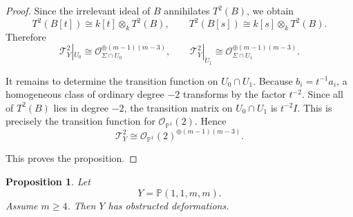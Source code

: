 \documentclass[11pt,twoside]{amsart}
\theoremstyle{plain}
\numberwithin{equation}{section}
\newtheorem{proposition}[theorem]{Proposition}
\newcommand{\OO}{\mathcal{O}}
\newcommand{\PP}{\mathbb{P}}
\theoremstyle{definition}
\begin{document}
\begin{proof}
Since the irrelevant ideal of \(B\) annihilates \(T^2(B)\), we obtain
\[
T^2(B[t])
\cong
k[t]\otimes_k T^2(B),
\qquad
T^2(B[s])
\cong
k[s]\otimes_k T^2(B).
\]
Therefore
\[
\mathcal{T}^2_Y|_{U_0}\cong \OO_{\Sigma\cap U_0}^{\oplus (m-1)(m-3)},
\qquad
\mathcal{T}^2_Y|_{U_1}\cong \OO_{\Sigma\cap U_1}^{\oplus (m-1)(m-3)}.
\]

It remains to determine the transition function on \(U_0\cap U_1\).
Because \(b_i=t^{-1}a_i\), a homogeneous class of ordinary degree \(-2\) transforms by the
factor \(t^{-2}\). Since all of \(T^2(B)\) lies in degree \(-2\), the transition matrix on
\(U_0\cap U_1\) is \(t^{-2}I\). This is precisely the transition function for
\(\OO_{\PP^1}(2)\). Hence
\[
\mathcal{T}^2_Y
\cong
\OO_{\PP^1}(2)^{\oplus (m-1)(m-3)}.
\]

This proves the proposition.
\end{proof}

\begin{proposition}\label{prop:wps-1122m-obstructed}
Let
\[
Y=\mathbb{P}(1,1,m,m).
\]
Assume \(m\geq 4\). Then \(Y\) has obstructed deformations.
\end{proposition}
\end{document}
